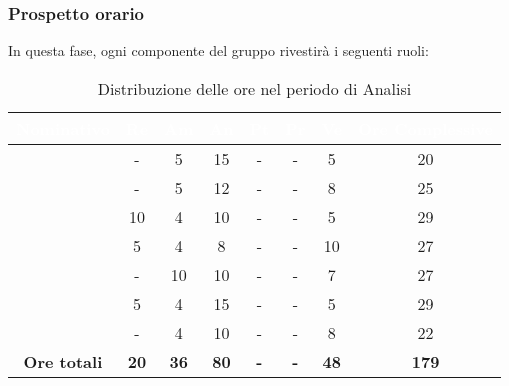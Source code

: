 \subsubsection{Prospetto orario}
In questa fase, ogni componente del gruppo rivestirà i seguenti ruoli:
\begin{table}[H]
	\begin{center}
		\begin{tabular}{ |c c c c c c c c|}
		\rowcolor{darkblue} 
		\textcolor{white}{\textbf{Nominativo}} & \textcolor{white}{\textbf{Re}} & \textcolor{white}{\textbf{Am}} & \textcolor{white}{\textbf{An}} & \textcolor{white}{\textbf{Pt}} & \textcolor{white}{\textbf{Pr}} & \textcolor{white}{\textbf{Ve}} & \textcolor{white}{\textbf{Ore Complessive}} \\ \hline
		\BL & -  & 5  & 15 & - & - & 5 & 20 \\ \hline
		\FF & -  & 5  & 12 & - & - & 8  & 25 \\ \hline
		\MM & 10  & 4  & 10 & - & - & 5 & 29 \\ \hline
		\PC & 5 & 4  & 8 & - & - & 10 & 27 \\ \hline
		\TG & -  & 10 & 10 & - & - & 7 & 27 \\ \hline
		\TL & 5  & 4 & 15 & - & - & 5 & 29 \\ \hline
		\VD & -  & 4  & 10 & - & - & 8 & 22 \\ \hline
		\textbf{Ore totali} & \textbf{20} & \textbf{36} & \textbf{80} & \textbf{-} & \textbf{-} & \textbf{48} & \textbf{179} \\ \hline
		\end{tabular}
	\caption{Distribuzione delle ore nel periodo di Analisi}
	\end{center}
\end{table}
